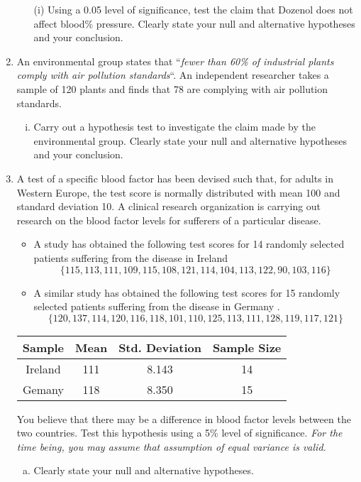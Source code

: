 \documentclass[]{article}
\begin{document}
\begin{enumerate}
\begin{itemize}
    \item[(i)] Using a 0.05 level of significance, test the claim that Dozenol does not affect blood\% pressure. Clearly state your null and alternative hypotheses and your conclusion.
\end{itemize}

\item An environmental group states that ``\textit{fewer than 60\% of industrial plants comply with air pollution standards}``. An independent researcher takes a sample of 120 plants and finds that 78 are complying with air pollution standards. 

\begin{enumerate}[(i)]
\item  Carry out a hypothesis test to investigate the claim made by the environmental group. Clearly state your null and alternative hypotheses and your conclusion.
\end{enumerate}

\item 
A test of a specific blood factor has been devised such that, for adults in Western Europe, the test score is normally distributed with mean 100 and standard deviation 10. A clinical research organization is carrying out research on the blood factor levels for sufferers of a particular disease.  

\begin{itemize}
	\item A study has obtained the following test scores for 14 randomly selected patients suffering from the disease in Ireland 
	\[ \{115, 113, 111, 109, 115, 108, 121, 114, 104, 113, 122, 90, 
	103, 116\}\]
	
	\item A similar study has obtained the following test scores for 15 randomly selected patients suffering from the disease in Germany .
	\[\{120, 137, 114, 120, 116, 118, 101, 110, 125, 113, 111, 128, 
	119, 117, 121\}\]
	
	\end{itemize}
	
		\begin{center}	
	\begin{tabular}{|c|c|c|c|} \hline 
		Sample & Mean & Std. Deviation & Sample Size \\  \hline 
		Ireland & 111 & 8.143 & 14 \\ \hline 
		Gemany & 118 & 8.350 & 15 \\ \hline
		\end{tabular} 
				\end{center}
You believe that there may be a difference in blood factor levels between the two countries. Test this hypothesis using a 5\% level of significance. \textit{For the time being, you may assume that assumption of equal variance is valid. }
\begin{enumerate}[(a)]
	\item Clearly state your null and alternative hypotheses.


\end{enumerate}
\end{enumerate}
\end{document}
